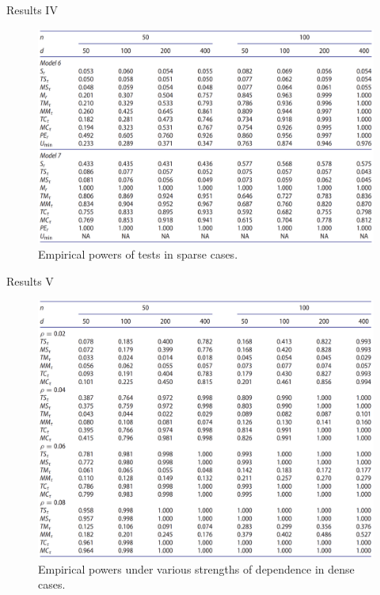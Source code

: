 \documentclass[
  ignorenonframetext,
]{beamer}
\begin{document}
\begin{frame}{Results IV}
\label{results-iv}
\begin{figure}

{\centering \includegraphics[width=0.8\linewidth]{Figures/Table3} 

}

\caption{Empirical powers of tests in sparse cases.}\label{fig:Table 3}
\end{figure}
\end{frame}

\begin{frame}{Results V}
\label{results-v}
\begin{figure}

{\centering \includegraphics[width=0.8\linewidth,height=0.77\textheight]{Figures/Table4} 

}

\caption{Empirical powers under various strengths of dependence in dense cases.}\label{fig:Table 4}
\end{figure}
\end{frame}
\end{document}
